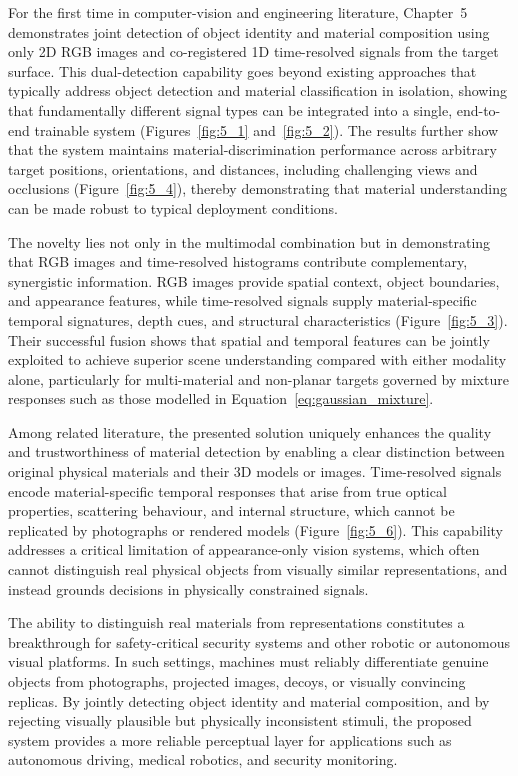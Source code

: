 \documentclass[12pt,a4paper,oneside]{report}
\begin{document}
For the first time in computer-vision and engineering literature, Chapter~5 demonstrates joint detection of object identity and material composition using only 2D RGB images and co-registered 1D time-resolved signals from the target surface. This dual-detection capability goes beyond existing approaches that typically address object detection and material classification in isolation, showing that fundamentally different signal types can be integrated into a single, end-to-end trainable system (Figures~\ref{fig:5_1} and~\ref{fig:5_2}). The results further show that the system maintains material-discrimination performance across arbitrary target positions, orientations, and distances, including challenging views and occlusions (Figure~\ref{fig:5_4}), thereby demonstrating that material understanding can be made robust to typical deployment conditions.

The novelty lies not only in the multimodal combination but in demonstrating that RGB images and time-resolved histograms contribute complementary, synergistic information. RGB images provide spatial context, object boundaries, and appearance features, while time-resolved signals supply material-specific temporal signatures, depth cues, and structural characteristics (Figure~\ref{fig:5_3}). Their successful fusion shows that spatial and temporal features can be jointly exploited to achieve superior scene understanding compared with either modality alone, particularly for multi-material and non-planar targets governed by mixture responses such as those modelled in Equation~\ref{eq:gaussian_mixture}.

Among related literature, the presented solution uniquely enhances the quality and trustworthiness of material detection by enabling a clear distinction between original physical materials and their 3D models or images. Time-resolved signals encode material-specific temporal responses that arise from true optical properties, scattering behaviour, and internal structure, which cannot be replicated by photographs or rendered models (Figure~\ref{fig:5_6}). This capability addresses a critical limitation of appearance-only vision systems, which often cannot distinguish real physical objects from visually similar representations, and instead grounds decisions in physically constrained signals.

The ability to distinguish real materials from representations constitutes a breakthrough for safety-critical security systems and other robotic or autonomous visual platforms. In such settings, machines must reliably differentiate genuine objects from photographs, projected images, decoys, or visually convincing replicas. By jointly detecting object identity and material composition, and by rejecting visually plausible but physically inconsistent stimuli, the proposed system provides a more reliable perceptual layer for applications such as autonomous driving, medical robotics, and security monitoring.
\end{document}
